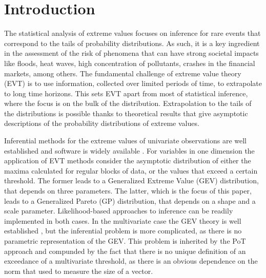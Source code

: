 
\section{Introduction}
The statistical analysis of extreme values focuses on inference for
rare events that correspond to the tails of probability distributions.
As such, it is a key ingredient in the assessment of the risk of
phenomena that can have strong societal impacts like floods, heat waves,
high concentration of pollutants, crashes in the financial markets,
among others. The fundamental challenge of extreme value theory (EVT) is
to use information, collected over limited periods of time, to
extrapolate to long time horizons. This sets EVT apart from most of
statistical inference, where the focus is on the bulk of the
distribution. Extrapolation to the tails of the distributions is
possible thanks to theoretical results that give asymptotic descriptions
of the probability distributions of extreme values. 

Inferential methods for the extreme values of univariate observations
are well established and software is widely available \cite[see, for
example,][]{coles2001}. For variables in one dimension the application of EVT methods consider the asymptotic distribution of either the maxima calculated for regular blocks of data, or the values that exceed a certain threshold. The former leads to a Generalized Extreme Value (GEV) distribution, that depends on three parameters. The latter, which is the focus of this paper, leads to a Generalized Pareto (GP) distribution, that depends on a shape and a scale parameter. Likelihood-based approaches to inference can be readily implemented in both cases.
In the multivariate case the GEV theory is well established \citep[see, for example][]{dehaan2006}, but the inferential problem is more complicated, as there is no parametric representation of the GEV. This problem is inherited by the PoT approach and compunded by the fact that there is no unique definition of an exceedance of a multivariate threshold, as there is an obvious dependence on the norm that used to measure the size of a vector. 


